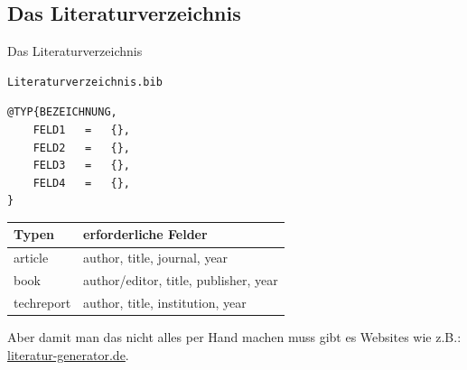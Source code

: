 \documentclass["WS\space 16-17\space -\space LaTeX-Kurs\space -\space Praesentation\space -\space 3.tex"]{subfiles}
\begin{document}
\subsection{Das Literaturverzeichnis}
\begin{frame}[c]
	\begin{center}
		\large Das Literaturverzeichnis
	\end{center}
\end{frame}
\begin{frame}[fragile]
	\begin{lstlisting}
Literaturverzeichnis.bib
	\end{lstlisting}
	\begin{lstlisting}
@TYP{BEZEICHNUNG,
	FELD1	=	{},
	FELD2	=	{},
	FELD3	=	{},
	FELD4	=	{},
}
	\end{lstlisting}
	\begin{center}
		\begin{tabular}{ll}
			\toprule					
			Typen			&	erforderliche Felder						\\ \midrule
			article			&	author, title, journal, year				\\	
			book			&	author/editor, title, publisher, year		\\
			techreport		&	author, title, institution, year			\\
			\bottomrule
		\end{tabular}
	\end{center}
	\vspace{0.1cm}
\end{frame}
\begin{frame}
	Aber damit man das nicht alles per Hand machen muss gibt es Websites wie z.B.:
	\href{http://literatur-generator.de}{\textrm{literatur-generator.de}}.
\end{frame}
\end{document}

